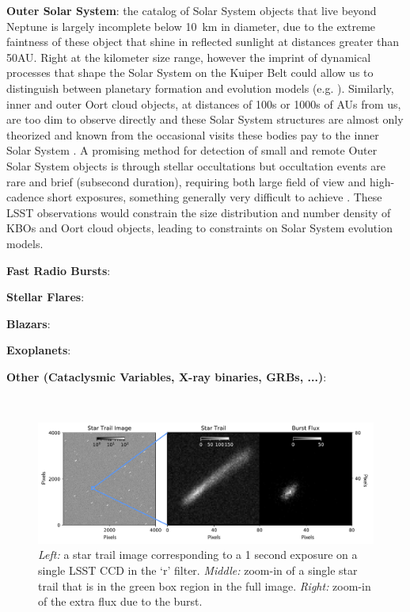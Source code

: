 \documentclass[12pt, letterpaper]{article}
\begin{document}
{\bf Outer Solar System}: the catalog of Solar System objects that live beyond Neptune is largely incomplete below 10~km in diameter, due to the extreme faintness of these object that shine in reflected sunlight at distances greater than 50AU. Right at the kilometer size range, however the imprint of dynamical processes that shape the Solar System on the Kuiper Belt could allow us to distinguish between planetary formation and evolution models (e.g. \citealt{Kenyon04}). Similarly, inner and outer Oort cloud objects, at distances of 100s or 1000s of AUs from us, are too dim to observe directly and these Solar System structures are almost only theorized and known from the occasional visits these bodies pay to the inner Solar System \citep{Levison07}. A promising method for detection of small and remote Outer Solar System objects is through stellar occultations \citep{Nihei07, Schlichting12}
 but occultation events are rare and brief (subsecond duration), requiring both large field of view and high-cadence short exposures, something generally very difficult to achieve \citep{Bianco09}. These LSST observations would constrain the size distribution and number density of KBOs and Oort cloud objects, leading to constraints on Solar System evolution models.

{\color{green}

{\bf Fast Radio Bursts}: 

{\bf Stellar Flares}: 

{\bf Blazars}: 

{\bf Exoplanets}: 

{\bf Other (Cataclysmic Variables, X-ray binaries, GRBs, ...)}: 
}
\
\begin{figure}[htb]
\center
\includegraphics[width=1.00\columnwidth]{star_trail.pdf}
\caption{\textit{Left:} a star trail image corresponding to a 1 second exposure on a single LSST CCD in the `r' filter. \textit{Middle:} zoom-in of a single star trail that is in the green box region in the full image. \textit{Right:} zoom-in of the extra flux due to the burst.}
\label{fig:trail}
\end{figure}
\end{document}
